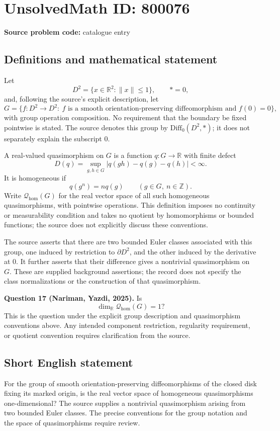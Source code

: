 \documentclass[11pt]{article}
\newcommand{\Z}{\mathbb{Z}}
\newcommand{\R}{\mathbb{R}}
\begin{document}
\section*{UnsolvedMath ID: 800076}
\textbf{Source problem code:} catalogue entry
\subsection{Definitions and mathematical statement}
Let
\[
D^2=\{x\in\R^2:\|x\|\leq 1\},\qquad *=0,
\]
and, following the source's explicit description, let
\[
G=\{f:D^2\longrightarrow D^2:\ f\text{ is a smooth orientation-preserving diffeomorphism and }f(0)=0\},
\]
with group operation composition. No requirement that the boundary be fixed pointwise is stated. The source denotes this group by \(\mathrm{Diff}_0(D^2,*)\); it does not separately explain the subscript \(0\).

A real-valued quasimorphism on \(G\) is a function \(q:G\to\R\) with finite defect
\[
D(q)=\sup_{g,h\in G}|q(gh)-q(g)-q(h)|<\infty.
\]
It is homogeneous if
\[
q(g^n)=nq(g)\qquad(g\in G,\ n\in\Z).
\]
Write \(\mathcal Q_{\mathrm{hom}}(G)\) for the real vector space of all such homogeneous quasimorphisms, with pointwise operations. This definition imposes no continuity or measurability condition and takes no quotient by homomorphisms or bounded functions; the source does not explicitly discuss these conventions.

The source asserts that there are two bounded Euler classes associated with this group, one induced by restriction to \(\partial D^2\), and the other induced by the derivative at \(0\). It further asserts that their difference gives a nontrivial quasimorphism on \(G\). These are supplied background assertions; the record does not specify the class normalizations or the construction of that quasimorphism.

\textbf{Question 17 (Nariman, Yazdi, 2025).} Is
\[
\dim_{\R}\mathcal Q_{\mathrm{hom}}(G)=1?
\]
This is the question under the explicit group description and quasimorphism conventions above. Any intended component restriction, regularity requirement, or quotient convention requires clarification from the source.
\subsection{Short English statement}
For the group of smooth orientation-preserving diffeomorphisms of the closed disk fixing its marked origin, is the real vector space of homogeneous quasimorphisms one-dimensional? The source supplies a nontrivial quasimorphism arising from two bounded Euler classes. The precise conventions for the group notation and the space of quasimorphisms require review.
\end{document}
